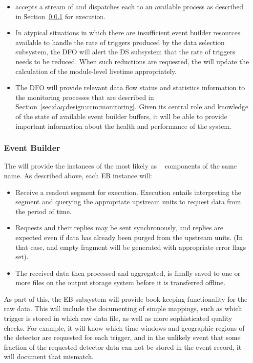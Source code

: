 \begin{itemize}
\item {} accepts a stream of  and dispatches each to an available  process as described in Section~\ref{sec:daq:design-event-builder} for execution.
\item In atypical situations in which there are insufficient event builder resources available to handle the rate of triggers produced by the data selection subsystem, the DFO will alert the DS subsystem that the rate of triggers needs to be reduced.  When such reductions are requested, the  will update the calculation of the module-level  livetime appropriately.
\item The DFO will provide relevant data flow status and statistics information to the monitoring processes that are described in Section~\ref{sec:daq:design:ccm:monitoring}. Given its central role and knowledge of the state of available event builder buffers, it will be able to provide important information about the health and performance of the system.
\end{itemize}

\subsubsection{Event Builder}
\label{sec:daq:design-event-builder}

The  will provide the instances of the  most likely as
~\cite{artdaq} components of the same name. 
As described above, each EB instance will:

\begin{itemize}
  \item Receive a readout segment for execution. Execution entails interpreting the  segment and querying the appropriate upstream  units to request data from the period of time. 
  \item Requests and their replies may be sent synchronously, and replies are expected even if data has already been purged from the upstream  units. (In that case, and empty fragment will be generated with appropriate error flags set).
  \item The received data then processed and aggregated, is finally saved to one or more files on the output storage system before it is transferred offline.
\end{itemize}

As part of this, the EB subsystem will provide book-keeping functionality for the raw data.  This will include the documenting of simple mappings, such as which trigger is stored in which raw data file, as well as more sophisticated quality checks. For example, it will know which time windows and geographic regions of the detector are requested for each trigger, and in the unlikely event that some fraction of the requested detector data can not be stored in the event record, it will document that mismatch.

